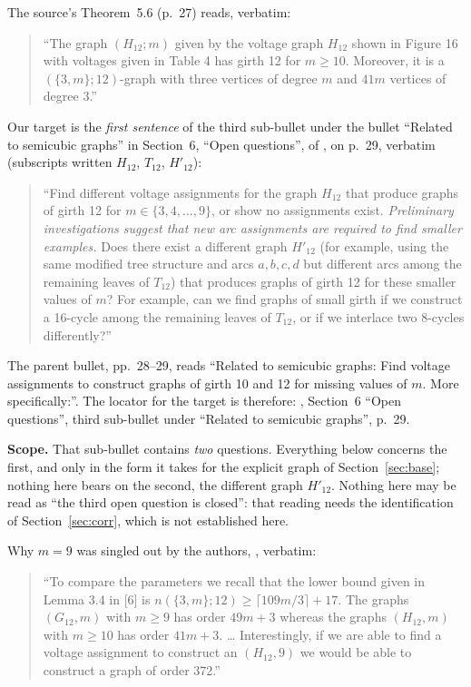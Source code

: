 \documentclass[11pt]{amsart}
\theoremstyle{remark}
\begin{document}
The source's Theorem~5.6 (p.~27) reads, verbatim:

\begin{quote}
``The graph $(H_{12};m)$ given by the voltage graph $H_{12}$ shown in Figure 16 with voltages
given in Table 4 has girth 12 for $m \ge 10$. Moreover, it is a $(\{3,m\};12)$-graph with three
vertices of degree $m$ and $41m$ vertices of degree 3.''
\end{quote}

\noindent
Our target is the \emph{first sentence} of the third sub-bullet under the bullet ``Related to
semicubic graphs'' in Section~6, ``Open questions'', of \cite{AAB}, on p.~29, verbatim
(subscripts written $H_{12}$, $T_{12}$, $H'_{12}$):

\begin{quote}
``Find different voltage assignments for the graph $H_{12}$ that produce graphs of girth 12 for
$m \in \{3, 4, \dots , 9\}$, or show no assignments exist. \emph{Preliminary investigations
suggest that new arc assignments are required to find smaller examples.} Does there exist a
different graph $H'_{12}$ (for example, using the same modified tree structure and arcs
$a, b, c, d$ but different arcs among the remaining leaves of $T_{12}$) that produces graphs of
girth 12 for these smaller values of $m$? For example, can we find graphs of small girth if we
construct a 16-cycle among the remaining leaves of $T_{12}$, or if we interlace two 8-cycles
differently?''
\end{quote}

The parent bullet, pp.~28--29, reads ``Related to semicubic graphs: Find voltage assignments to
construct graphs of girth 10 and 12 for missing values of $m$. More specifically:''. The
locator for the target is therefore: \cite{AAB}, Section~6 ``Open questions'', third
sub-bullet under ``Related to semicubic graphs'', p.~29.

\medskip
\noindent\textbf{Scope.}
That sub-bullet contains \emph{two} questions. Everything below concerns the first, and only in
the form it takes for the explicit graph of Section~\ref{sec:base}; nothing here bears on the
second, the different graph $H'_{12}$. Nothing here may be read as ``the third open question is
closed'': that reading needs the identification of Section~\ref{sec:corr}, which is not
established here.

\medskip
\noindent
Why $m=9$ was singled out by the authors, \cite[p.~28]{AAB}, verbatim:

\begin{quote}
``To compare the parameters we recall that the lower bound given in Lemma 3.4 in [6] is
$n(\{3,m\};12) \ge \lceil 109m/3\rceil + 17$. The graphs $(G_{12}, m)$ with $m \ge 9$ has order
$49m + 3$ whereas the graphs $(H_{12}, m)$ with $m \ge 10$ has order $41m + 3$. \dots
Interestingly, if we are able to find a voltage assignment to construct an $(H_{12},9)$ we
would be able to construct a graph of order 372.''
\end{quote}
\end{document}
